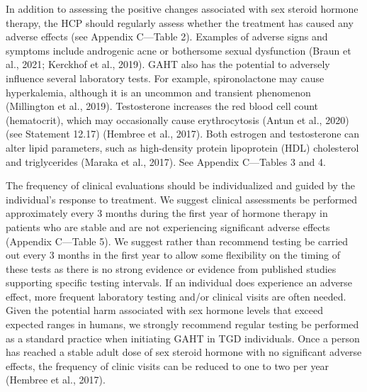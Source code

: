 \documentclass[
]{book}
\begin{document}
In addition to assessing the positive changes
associated with sex steroid hormone therapy, the
HCP should regularly assess whether the treatment has caused any adverse effects (see Appendix
C---Table 2). Examples of adverse signs and
symptoms include androgenic acne or bothersome
sexual dysfunction (Braun et al., 2021; Kerckhof
et al., 2019). GAHT also has the potential to
adversely influence several laboratory tests. For
example, spironolactone may cause hyperkalemia,
although it is an uncommon and transient phenomenon (Millington et al., 2019). Testosterone
increases the red blood cell count (hematocrit),
which may occasionally cause erythrocytosis
(Antun et al., 2020) (see Statement 12.17)
(Hembree et al., 2017). Both estrogen and testosterone can alter lipid parameters, such as
high-density protein lipoprotein (HDL) cholesterol and triglycerides (Maraka et al., 2017). See
Appendix C---Tables 3 and 4.

The frequency of clinical evaluations should
be individualized and guided by the individual's
response to treatment. We suggest clinical assessments be performed approximately every 3
months during the first year of hormone therapy
in patients who are stable and are not experiencing significant adverse effects (Appendix C---Table
5). We suggest rather than recommend testing
be carried out every 3 months in the first year
to allow some flexibility on the timing of these
tests as there is no strong evidence or evidence
from published studies supporting specific testing
intervals. If an individual does experience an
adverse effect, more frequent laboratory testing
and/or clinical visits are often needed. Given the
potential harm associated with sex hormone levels that exceed expected ranges in humans, we
strongly recommend regular testing be performed
as a standard practice when initiating GAHT in
TGD individuals. Once a person has reached a
stable adult dose of sex steroid hormone with no
significant adverse effects, the frequency of clinic
visits can be reduced to one to two per year
(Hembree et al., 2017).
\end{document}
